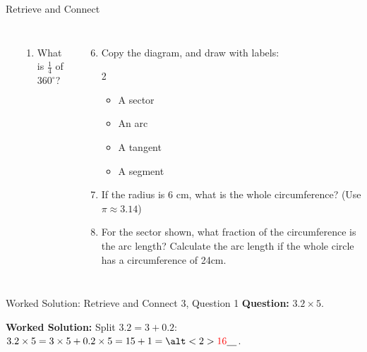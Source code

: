 \documentclass{beamer}
\newcommand{\ablank}[1]{%
  \alt<2>{\textcolor{red}{#1}}{\underline{\phantom{#1}}}%
}
\newcommand{\ashow}[1]{\uncover<2->{\textcolor{red}{\small #1}}}
\begin{document}
\begin{frame}{Retrieve and Connect}
\begin{columns}
\begin{center}
\begin{tikzpicture}[scale=1]
\end{tikzpicture}

\end{center}

\small
\begin{enumerate}
  \item What is $\frac{1}{4}$ of $360^\circ$? \ashow{$90^\circ$}
\end{enumerate}

\begin{enumerate}
  \setcounter{enumi}{5}
  \item Copy the diagram, and draw with labels:
    \begin{multicols}{2}
    \begin{itemize}
      \item A sector
      \item An arc
      \item A tangent
      \item A segment
    \end{itemize}
    \end{multicols}
  \item If the radius is $6$ cm, what is the whole circumference? (Use $\pi \approx 3.14$) \ashow{$37.68$ cm}
  \item For the sector shown, what fraction of the circumference is the arc length? Calculate the arc length if the whole circle has a circumference of 24cm. \ashow{$\frac{1}{6}$; $4$ cm}

\end{enumerate}

\end{columns}
\end{frame}

\begin{frame}{Worked Solution: Retrieve and Connect 3, Question 1}
\hypertarget{work-st3}{}
\small
\textbf{Question:} \(3.2\times5\).

\textbf{Worked Solution:} Split \(3.2=3+0.2\):
\(3.2\times5=3\times5+0.2\times5=15+1=\ablank{16}\).
\end{frame}
\end{document}
